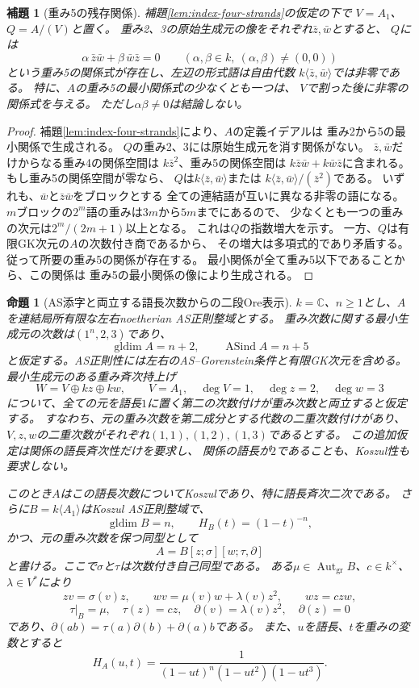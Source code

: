 \documentclass[11pt,a4paper]{ltjsarticle}
\newtheorem{proposition}[theorem]{命題}
\newtheorem{lemma}[theorem]{補題}
\theoremstyle{definition}
\begin{document}
\begin{lemma}[重み5の残存関係]\label{lem:index-heavy-relation}
補題\ref{lem:index-four-strands}の仮定の下で
$V=A_1$、$Q=A/(V)$と置く。
重み2、3の原始生成元の像をそれぞれ$\bar z,\bar w$とすると、
$Q$には
\[
\alpha\,\bar z\bar w+\beta\,\bar w\bar z=0
\qquad(\alpha,\beta\in k,\ (\alpha,\beta)\ne(0,0))
\]
という重み5の関係式が存在し、左辺の形式語は自由代数
$k\langle\bar z,\bar w\rangle$では非零である。
特に、$A$の重み5の最小関係式の少なくとも一つは、
$V$で割った後に非零の関係式を与える。
ただし$\alpha\beta\ne0$は結論しない。
\end{lemma}
\begin{proof}
補題\ref{lem:index-four-strands}により、$A$の定義イデアルは
重み2から5の最小関係で生成される。
$Q$の重み2、3には原始生成元を消す関係がない。
$\bar z,\bar w$だけからなる重み4の関係空間は
$k\bar z^2$、重み5の関係空間は
$k\bar z\bar w+k\bar w\bar z$に含まれる。
もし重み5の関係空間が零なら、
$Q$は$k\langle\bar z,\bar w\rangle$または
$k\langle\bar z,\bar w\rangle/(\bar z^2)$である。
いずれも、$\bar w$と$\bar z\bar w$をブロックとする
全ての連結語が互いに異なる非零の語になる。
$m$ブロックの$2^m$語の重みは$3m$から$5m$までにあるので、
少なくとも一つの重みの次元は$2^m/(2m+1)$以上となる。
これは$Q$の指数増大を示す。
一方、$Q$は有限GK次元の$A$の次数付き商であるから、
その増大は多項式的であり矛盾する。
従って所要の重み5の関係が存在する。
最小関係が全て重み5以下であることから、この関係は
重み5の最小関係の像により生成される。
\end{proof}

\begin{proposition}[AS添字と両立する語長次数からの二段Ore表示]
\label{prop:index-compatible-word-grading}
$k=\mathbb C$、$n\geq1$とし、$A$を連結局所有限な左右noetherian AS正則整域とする。
重み次数に関する最小生成元の次数は$(1^n,2,3)$であり、
\[
 \operatorname{gldim}A=n+2,\qquad
 \operatorname{ASind}A=n+5
\]
と仮定する。AS正則性には左右のAS--Gorenstein条件と有限GK次元を含める。
最小生成元のある重み斉次持上げ
\[
 W=V\oplus kz\oplus kw,\qquad
 V=A_1,\quad \deg V=1,\quad \deg z=2,\quad\deg w=3
\]
について、全ての元を語長$1$に置く第二の次数付けが重み次数と両立すると仮定する。
すなわち、元の重み次数を第二成分とする代数の二重次数付けがあり、
$V,z,w$の二重次数がそれぞれ$(1,1),(1,2),(1,3)$であるとする。
この追加仮定は関係の語長斉次性だけを要求し、
関係の語長が$2$であることも、Koszul性も要求しない。

このとき$A$はこの語長次数についてKoszulであり、特に語長斉次二次である。
さらに$B=k\langle A_1\rangle$はKoszul AS正則整域で、
\[
 \operatorname{gldim}B=n,\qquad H_B(t)=(1-t)^{-n},
\]
かつ、元の重み次数を保つ同型として
\[
 A=B[z;\sigma][w;\tau,\partial]
\]
と書ける。ここで$\sigma$と$\tau$は次数付き自己同型である。
ある$\mu\in\operatorname{Aut}_{\mathrm{gr}}B$、$c\in k^\times$、$\lambda\in V^*$により
\[
 zv=\sigma(v)z,\qquad
 wv=\mu(v)w+\lambda(v)z^2,\qquad
 wz=c zw,
\]
\[
 \tau|_B=\mu,\quad \tau(z)=cz,\quad
 \partial(v)=\lambda(v)z^2,\quad \partial(z)=0
\]
であり、$\partial(ab)=\tau(a)\partial(b)+\partial(a)b$である。
また、$u$を語長、$t$を重みの変数とすると
\[
 H_A(u,t)=\frac{1}{(1-ut)^n(1-ut^2)(1-ut^3)}.
\]
\end{proposition}
\end{document}
